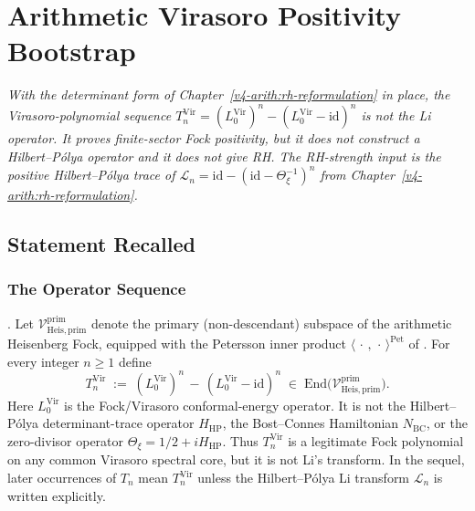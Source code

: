 \chapter{Arithmetic Virasoro Positivity Bootstrap}
\label{v4-arith:virasoro-bootstrap}

\emph{With the determinant form of
Chapter~\ref{v4-arith:rh-reformulation} in place, the
Virasoro-polynomial sequence
\(T_{n}^{\mathrm{Vir}}=(L_{0}^{\mathrm{Vir}})^{n}-(L_{0}^{\mathrm{Vir}}-\mathrm{id})^{n}\)
is not the Li operator. It proves finite-sector Fock positivity, but
it does not construct a Hilbert--P\'olya operator and it does not give
RH. The RH-strength input is the positive Hilbert--P\'olya trace of
\(\mathcal L_{n}=\mathrm{id}-(\mathrm{id}-\Theta_{\xi}^{-1})^{n}\)
from Chapter~\ref{v4-arith:rh-reformulation}.}

\section{Statement Recalled}
\label{v4-arith:vb:statement}

\subsection{The Operator Sequence}
\label{v4-arith:vb:operator-sequence}

\begin{definition}
\label{v4-arith:vb:def:T_n}
\ClaimStatusDefinitional. Let \(\mathcal{V}^{\mathrm{prim}}_{\mathrm{Heis},\mathrm{prim}}\)
denote the primary (non-descendant) subspace of the arithmetic
Heisenberg Fock, equipped with the Petersson inner product
\(\langle\,\cdot\,,\,\cdot\,\rangle^{\mathrm{Pet}}\) of
. For every integer \(n\geq 1\)
define
\begin{equation}
\label{v4-arith:vb:eq:T_n-def}
T_{n}^{\mathrm{Vir}}\;:=\;(L_{0}^{\mathrm{Vir}})^{n}
\,-\,(L_{0}^{\mathrm{Vir}}-\mathrm{id})^{n}
\;\in\;\mathrm{End}\bigl(\mathcal{V}^{\mathrm{prim}}_{\mathrm{Heis},\mathrm{prim}}\bigr).
\end{equation}
Here \(L_{0}^{\mathrm{Vir}}\) is the Fock/Virasoro conformal-energy
operator. It is not the Hilbert--P\'olya determinant-trace operator
\(H_{\mathrm{HP}}\), the Bost--Connes Hamiltonian \(N_{\mathrm{BC}}\),
or the zero-divisor operator \(\Theta_{\xi}=1/2+iH_{\mathrm{HP}}\). Thus
\(T_{n}^{\mathrm{Vir}}\) is a legitimate Fock polynomial on any
common Virasoro spectral core, but it is not Li's transform.
In the sequel, later occurrences of
\(T_n\) mean \(T_{n}^{\mathrm{Vir}}\) unless the Hilbert--P\'olya
Li transform \(\mathcal L_n\) is written explicitly.
\end{definition}

